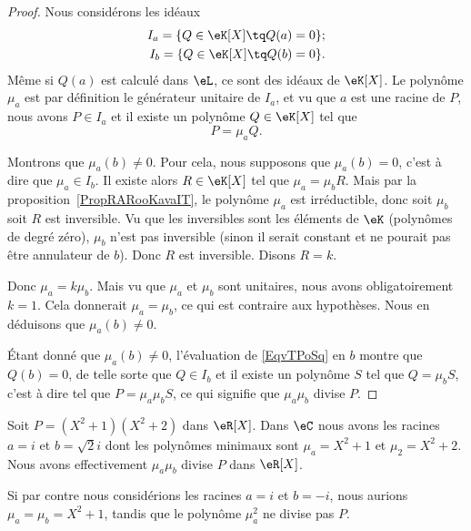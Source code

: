 \begin{proof}
    Nous considérons les idéaux
    \begin{subequations}
        \begin{align}
            I_a=\{ Q\in \eK[X]\tq Q(a)=0 \};\\
            I_b=\{ Q\in \eK[X]\tq Q(b)=0 \}.
        \end{align}
    \end{subequations}
    Même si \( Q(a)\) est calculé dans \( \eL\), ce sont des idéaux de \( \eK[X]\). Le polynôme \( \mu_a\) est par définition le générateur unitaire de \( I_a\), et vu que \( a\) est une racine de \( P\), nous avons \( P\in I_a\) et il existe un polynôme \( Q\in \eK[X]\) tel que
    \begin{equation}    \label{EqvTPoSq}
        P=\mu_aQ.
    \end{equation}

    Montrons que \( \mu_a(b)\neq 0\). Pour cela, nous  supposons que \( \mu_a(b)=0\), c'est à dire que \( \mu_a\in I_b\). Il existe alors \( R\in \eK[X]\) tel que \( \mu_a=\mu_bR\). Mais par la proposition~\ref{PropRARooKavaIT}, le polynôme \( \mu_a\) est irréductible, donc soit \( \mu_b\) soit \( R\) est inversible. Vu que les inversibles sont les éléments de \( \eK\) (polynômes de degré zéro), \( \mu_b\) n'est pas inversible (sinon il serait constant et ne pourait pas être annulateur de \( b\)). Donc \( R\) est inversible. Disons \( R=k\).

    Donc \( \mu_a=k\mu_b\). Mais vu que \( \mu_a\) et \( \mu_b\) sont unitaires, nous avons obligatoirement \( k=1\). Cela donnerait \( \mu_a=\mu_b\), ce qui est contraire aux hypothèses. Nous en déduisons que \( \mu_a(b)\neq 0\).

    Étant donné que \( \mu_a(b)\neq 0\), l'évaluation de \eqref{EqvTPoSq} en \( b\) montre que \( Q(b)=0\), de telle sorte que \( Q\in I_b\) et il existe un polynôme \( S\) tel que \( Q=\mu_bS\), c'est à dire tel que \( P=\mu_a\mu_bS\), ce qui signifie que \( \mu_a\mu_b\) divise \( P\).
\end{proof}

\begin{example}
    Soit \( P=(X^2+1)(X^2+2)\) dans \( \eR[X]\). Dans \( \eC\) nous avons les racines \( a=i\) et \( b=\sqrt{2}i\) dont les polynômes minimaux sont \( \mu_a=X^2+1\) et \( \mu_2=X^2+2\). Nous avons effectivement \( \mu_a\mu_b\) divise \( P\) dans \( \eR[X]\).

    Si par contre nous considérions les racines \( a=i\) et \( b=-i\), nous aurions \( \mu_a=\mu_b=X^2+1\), tandis que le polynôme \( \mu_a^2\) ne divise pas \( P\).
\end{example}
